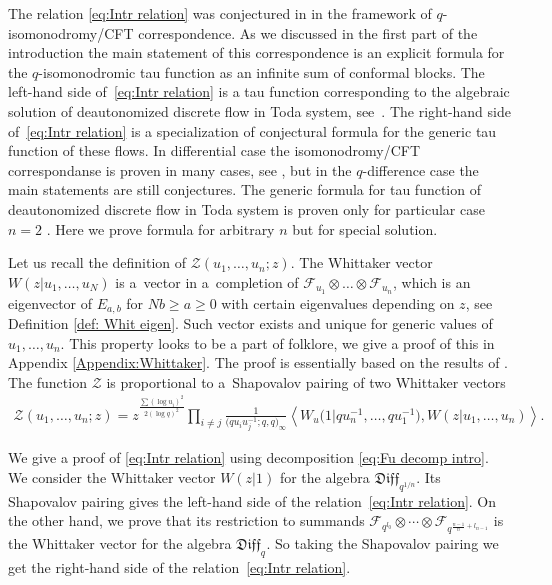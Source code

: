 \documentclass[pdftex]{sigma}
\numberwithin{equation}{section}
\theoremstyle{definition}
\newcommand{\qd}[1]{ \mathfrak{Diff}_{q^{#1}} }
\begin{document}
The relation \eqref{eq:Intr relation} was conjectured in \cite{BGM} in the framework of $q$-isomonodromy/CFT correspondence. As we discussed in the first part of the introduction the main statement of this correspondence is an explicit formula for the $q$-isomonodromic tau function as an infinite sum of conformal blocks. The left-hand side of~\eqref{eq:Intr relation} is a tau function corresponding to the algebraic solution of deautonomized discrete flow in Toda system, see~\cite[equation~(3.11)]{BGM}.
The right-hand side of~\eqref{eq:Intr relation} is a specialization of conjectural formula \cite[equation~(3.6)]{BGM} for the generic tau function of these flows. In differential case the isomonodromy/CFT correspondanse is proven in many cases, see \cite{BS:2014,GIL:2018,GL:2016, ILT:2015}, but in the $q$-difference case the main statements are still conjectures. The generic formula for tau function of deautonomized discrete flow in Toda system is proven only for particular case $n=2$ \cite{BS:2018,MN:2018}. Here we prove formula for arbitrary $n$ but for special solution.

Let us recall the definition of $\mathcal{Z}(u_1,\dots,u_n;z)$. The Whittaker vector $W(z|u_1,\dots,u_N)$ is a~vector in a~completion of $ \mathcal{F}_{u_1}\otimes\dots \otimes\mathcal{F}_{u_n}$, which is an eigenvector of $E_{a,b}$ for $Nb\geqslant a \geqslant 0$ with certain eigenvalues depending on $z$, see Definition \ref{def: Whit eigen}. Such vector exists and unique for generic values of $u_1,\dots,u_n$. This property looks to be a part of folklore, we give a proof of this in Appendix \ref{Appendix:Whittaker}. The proof is essentially based on the results of \cite{N17, N16}. The function $\mathcal{Z}$ is proportional to a~Shapovalov pairing of two Whittaker vectors
\begin{gather*}
\mathcal{Z} (u_1, \dots, u_n ; z)
 = z^{\frac{\sum (\log u_i)^2}{2 (\log q)^2}} \!\prod_{i \neq j}\! \frac{1}{\big(qu_i u_j^{-1}; q, q\big)_{\infty}} \left\langle W_u\big(1|qu_n^{-1}, \dots, qu_1^{-1}\big) , W(z| u_1, \dots, u_n) \right\rangle.%
\end{gather*}

We give a proof of \eqref{eq:Intr relation} using decomposition \eqref{eq:Fu decomp intro}. We consider the Whittaker vector $W(z|1)$ for the algebra $\qd{1/n}$. Its Shapovalov pairing gives the left-hand side of the relation~\eqref{eq:Intr relation}. On the other hand, we prove that its restriction to summands $\mathcal{F}_{q^{ l_0}} \otimes \cdots \otimes \mathcal{F}_{ q^{\frac{n-1}{n}+ l_{n-1} }}$ is the Whittaker vector for the algebra $\qd{}$. So taking the Shapovalov pairing we get the right-hand side of the relation~\eqref{eq:Intr relation}.
\end{document}
